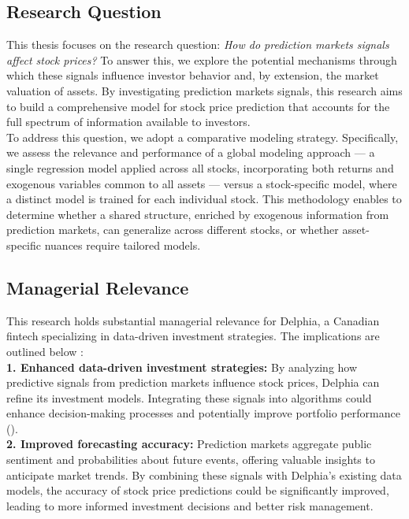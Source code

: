 \documentclass[12pt]{report}
\begin{document}
\subsection{Research Question}

This thesis focuses on the research question: \textit{How do prediction markets signals affect stock prices?} To answer this, we explore the potential mechanisms through which these signals influence investor behavior and, by extension, the market valuation of assets. By investigating prediction markets signals, this research aims to build a comprehensive model for stock price prediction that accounts for the full spectrum of information available to investors.\\

To address this question, we adopt a comparative modeling strategy. Specifically, we assess the relevance and performance of a global modeling approach — a single regression model applied across all stocks, incorporating both returns and exogenous variables common to all assets — versus a stock-specific model, where a distinct model is trained for each individual stock. This methodology enables to determine whether a shared structure, enriched by exogenous information from prediction markets, can generalize across different stocks, or whether asset-specific nuances require tailored models.


\newpage
\subsection{Managerial Relevance}

This research holds substantial managerial relevance for Delphia, a Canadian fintech specializing in data-driven investment strategies. The implications are outlined below : \\

\textbf{1. Enhanced data-driven investment strategies:}  
By analyzing how predictive signals from prediction markets influence stock prices, Delphia can refine its investment models. Integrating these signals into algorithms could enhance decision-making processes and potentially improve portfolio performance (\cite{waitz_corporate_2013}).\\

\textbf{2. Improved forecasting accuracy:}  
Prediction markets aggregate public sentiment and probabilities about future events, offering valuable insights to anticipate market trends. By combining these signals with Delphia’s existing data models, the accuracy of stock price predictions could be significantly improved, leading to more informed investment decisions and better risk management.\\
\end{document}
